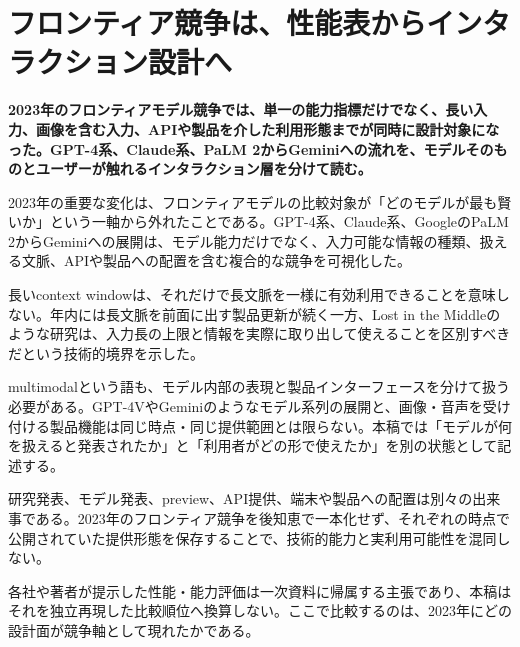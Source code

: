\section{フロンティア競争は、性能表からインタラクション設計へ}
\noindent\textbf{2023年のフロンティアモデル競争では、単一の能力指標だけでなく、長い入力、画像を含む入力、APIや製品を介した利用形態までが同時に設計対象になった。GPT-4系、Claude系、PaLM 2からGeminiへの流れを、モデルそのものとユーザーが触れるインタラクション層を分けて読む。}\autocite{src-013fa77665db,src-2b6af707f3ef,src-3375c5d27d9b,src-39071a9443e5,src-5bfa9c93d034,src-93d355bf8806,src-a3dead6cff65,src-a95452783369,src-b1525886b462,src-db671ee1d1b8,src-e116708067ab,src-f5041642fb21,src-f951bda6a0f4,src-fd9cb9c0061f}

2023年の重要な変化は、フロンティアモデルの比較対象が「どのモデルが最も賢いか」という一軸から外れたことである。GPT-4系、Claude系、GoogleのPaLM 2からGeminiへの展開は、モデル能力だけでなく、入力可能な情報の種類、扱える文脈、APIや製品への配置を含む複合的な競争を可視化した。\autocite{src-013fa77665db,src-3375c5d27d9b,src-39071a9443e5,src-5bfa9c93d034,src-93d355bf8806,src-a3dead6cff65,src-a95452783369,src-b1525886b462,src-db671ee1d1b8,src-e116708067ab,src-f5041642fb21,src-f951bda6a0f4,src-fd9cb9c0061f}


長いcontext windowは、それだけで長文脈を一様に有効利用できることを意味しない。年内には長文脈を前面に出す製品更新が続く一方、Lost in the Middleのような研究は、入力長の上限と情報を実際に取り出して使えることを区別すべきだという技術的境界を示した。\autocite{src-013fa77665db,src-2b6af707f3ef,src-39071a9443e5,src-93d355bf8806,src-a3dead6cff65,src-b1525886b462,src-db671ee1d1b8,src-f5041642fb21,src-fd9cb9c0061f}


multimodalという語も、モデル内部の表現と製品インターフェースを分けて扱う必要がある。GPT-4VやGeminiのようなモデル系列の展開と、画像・音声を受け付ける製品機能は同じ時点・同じ提供範囲とは限らない。本稿では「モデルが何を扱えると発表されたか」と「利用者がどの形で使えたか」を別の状態として記述する。\autocite{src-3375c5d27d9b,src-5bfa9c93d034,src-93d355bf8806,src-a3dead6cff65,src-a95452783369,src-db671ee1d1b8,src-f951bda6a0f4,src-fd9cb9c0061f}


研究発表、モデル発表、preview、API提供、端末や製品への配置は別々の出来事である。2023年のフロンティア競争を後知恵で一本化せず、それぞれの時点で公開されていた提供形態を保存することで、技術的能力と実利用可能性を混同しない。\autocite{src-013fa77665db,src-3375c5d27d9b,src-39071a9443e5,src-5bfa9c93d034,src-93d355bf8806,src-a3dead6cff65,src-a95452783369,src-b1525886b462,src-db671ee1d1b8,src-e116708067ab,src-f5041642fb21,src-f951bda6a0f4,src-fd9cb9c0061f}


\begin{claimboundary}
各社や著者が提示した性能・能力評価は一次資料に帰属する主張であり、本稿はそれを独立再現した比較順位へ換算しない。ここで比較するのは、2023年にどの設計面が競争軸として現れたかである。\autocite{src-3375c5d27d9b,src-5bfa9c93d034,src-a95452783369,src-f951bda6a0f4}
\end{claimboundary}
